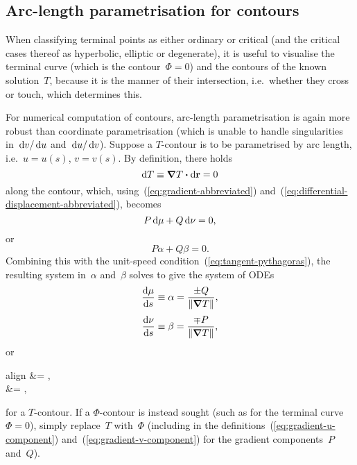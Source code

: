 \subsection{Arc-length parametrisation for contours}
\label{sec:curvilinear.tracing.arc-length-contours}

When classifying terminal points as either ordinary or critical
(and the critical cases thereof as hyperbolic, elliptic or degenerate),
it is useful to visualise the terminal curve (which is the contour~$\Phi = 0$)
and the contours of the known solution~$T$,
because it is the manner of their intersection,
i.e.~whether they cross or touch,
which determines this.

For numerical computation of contours,
arc-length parametrisation is again more robust
than coordinate parametrisation
(which is unable to handle singularities
in~$\mathop{}\!\mathrm{d} v / \mathop{}\!\mathrm{d} u$ and~$\mathop{}\!\mathrm{d} u / \mathop{}\!\mathrm{d} v$).
Suppose a $T$-contour is to be parametrised by arc length,
i.e.~$u = u (s)$, $v = v(s)$.
By definition, there holds
\[
  \mathop{}\!\mathrm{d} T \equiv \mathop{}\!\boldsymbol{\mathrm{\nabla}} T \boldsymbol{\cdot} \mathop{}\!\mathrm{d} \boldsymbol{\mathrm{r}} = 0
\]
along the contour,
which, using~(\ref{eq:gradient-abbreviated})
and~(\ref{eq:differential-displacement-abbreviated}),
becomes
\[
  P \mathop{}\!\mathrm{d} \mu + Q \mathop{}\!\mathrm{d} \nu = 0,
\]
or
\begin{equation}
  P \alpha + Q \beta = 0.
  \label{eq:contour-arc-length-parametrisation-contour}
\end{equation}
Combining this with the unit-speed condition~(\ref{eq:tangent-pythagoras}),
the resulting system in~$\alpha$ and~$\beta$
solves to give the system of ODEs
\begin{align}
  \tder{\mu}{s} &\defeq \alpha = \frac{\pm Q}{\norm{\del T}},
    \label{eq:contour-ode-arc-length-parametrisation-mu} \\[\fraclinespace]
  \tder{\nu}{s} &\defeq \beta = \frac{\mp P}{\norm{\del T}}
    \label{eq:contour-ode-arc-length-parametrisation-nu},
\end{align}
or
\begin{important}{align}
   &= ,
    \label{eq:contour-ode-arc-length-parametrisation-u} \\[\fraclinespace]
   &= 
    \label{eq:contour-ode-arc-length-parametrisation-v},
\end{important}
for a $T$-contour.
If a $\Phi$-contour is instead sought
(such as for the terminal curve~$\Phi = 0$),
simply replace~$T$ with~$\Phi$
(including in the definitions~(\ref{eq:gradient-u-component})
and~(\ref{eq:gradient-v-component})
for the gradient components~$P$ and~$Q$).
